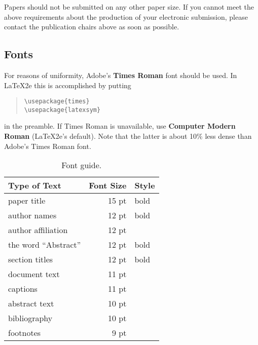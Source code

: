 \documentclass[11pt]{article}
\begin{document}
\noindent Papers should not be submitted on any other paper size.
If you cannot meet the above requirements about the production of
your electronic submission, please contact the publication chairs
above as soon as possible.


\subsection{Fonts}

For reasons of uniformity, Adobe's {\bf Times Roman} font should be
used. In \LaTeX2e{} this is accomplished by putting

\begin{quote}
  \begin{verbatim}
\usepackage{times}
\usepackage{latexsym}
\end{verbatim}
\end{quote}
in the preamble. If Times Roman is unavailable, use {\bf Computer
    Modern Roman} (\LaTeX2e{}'s default).  Note that the latter is about
10\% less dense than Adobe's Times Roman font.


\begin{table}[h]
  \begin{center}
    \begin{tabular}{|l|rl|}
      \hline \bf Type of Text & \bf Font Size & \bf Style \\ \hline
      paper title             & 15 pt         & bold      \\
      author names            & 12 pt         & bold      \\
      author affiliation      & 12 pt         &           \\
      the word ``Abstract''   & 12 pt         & bold      \\
      section titles          & 12 pt         & bold      \\
      document text           & 11 pt         &           \\
      captions                & 11 pt         &           \\
      abstract text           & 10 pt         &           \\
      bibliography            & 10 pt         &           \\
      footnotes               & 9 pt          &           \\
      \hline
    \end{tabular}
  \end{center}
  \caption{\label{font-table} Font guide. }
\end{table}
\end{document}
